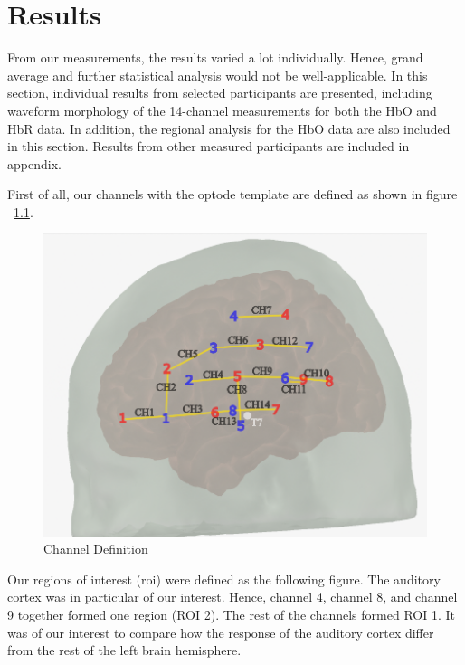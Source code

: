 \chapter{Results}

From our measurements, the results varied a lot individually. Hence, grand average and further statistical analysis would not be well-applicable. In this section, individual results from selected participants are presented, including waveform morphology of the 14-channel measurements for both the HbO and HbR data. In addition, the regional analysis for the HbO data are also included in this section. Results from other measured participants are included in appendix.

First of all, our channels with the optode template are defined as shown in figure ~\ref{fig:ChannelDef}.

\begin{figure}[H]
  \centering
    \includegraphics[scale=.45]{bilder/optode_ink.png}
  \caption{Channel Definition}
  \label{fig:ChannelDef}
\end{figure}


Our regions of interest (\acrshort{roi}) were defined as the following figure. The auditory cortex was in particular of our interest. Hence, channel 4, channel 8, and channel 9 together formed one region (ROI 2). The rest of the channels formed ROI 1. It was of our interest to compare how the response of the auditory cortex differ from the rest of the left brain hemisphere.


